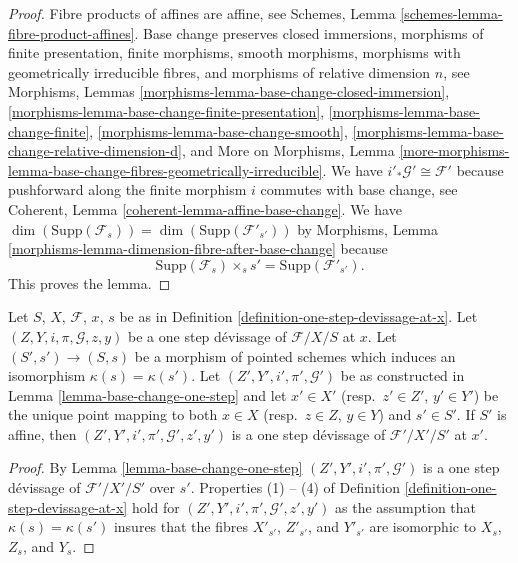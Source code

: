 \begin{proof}
Fibre products of affines are affine, see
Schemes, Lemma \ref{schemes-lemma-fibre-product-affines}.
Base change preserves
closed immersions,
morphisms of finite presentation,
finite morphisms,
smooth morphisms,
morphisms with geometrically irreducible fibres, and
morphisms of relative dimension $n$, see
Morphisms, Lemmas \ref{morphisms-lemma-base-change-closed-immersion},
\ref{morphisms-lemma-base-change-finite-presentation},
\ref{morphisms-lemma-base-change-finite},
\ref{morphisms-lemma-base-change-smooth}, 
\ref{morphisms-lemma-base-change-relative-dimension-d}, and
More on Morphisms, Lemma
\ref{more-morphisms-lemma-base-change-fibres-geometrically-irreducible}.
We have $i'_*\mathcal{G}' \cong \mathcal{F}'$ because pushforward
along the finite morphism $i$ commutes with base change, see
Coherent, Lemma \ref{coherent-lemma-affine-base-change}.
We have
$\dim(\text{Supp}(\mathcal{F}_s)) = \dim(\text{Supp}(\mathcal{F}'_{s'}))$
by
Morphisms, Lemma \ref{morphisms-lemma-dimension-fibre-after-base-change}
because
$$
\text{Supp}(\mathcal{F}_s) \times_s s' = \text{Supp}(\mathcal{F}'_{s'}).
$$
This proves the lemma.
\end{proof}

\begin{lemma}
\label{lemma-base-change-one-step-at-x}
Let $S$, $X$, $\mathcal{F}$, $x$, $s$ be as in
Definition \ref{definition-one-step-devissage-at-x}.
Let $(Z, Y, i, \pi, \mathcal{G}, z, y)$ be a one step d\'evissage
of $\mathcal{F}/X/S$ at $x$.
Let $(S', s') \to (S, s)$ be a morphism of pointed schemes
which induces an isomorphism $\kappa(s) = \kappa(s')$.
Let $(Z', Y', i', \pi', \mathcal{G}')$ be as constructed in
Lemma \ref{lemma-base-change-one-step}
and let $x' \in X'$ (resp.\ $z' \in Z'$, $y' \in Y'$) be the
unique point mapping to both $x \in X$ (resp.\ $z \in Z$, $y \in Y$)
and $s' \in S'$.
If $S'$ is affine, then $(Z', Y', i', \pi', \mathcal{G}', z', y')$
is a one step d\'evissage of $\mathcal{F}'/X'/S'$ at $x'$.
\end{lemma}

\begin{proof}
By
Lemma \ref{lemma-base-change-one-step}
$(Z', Y', i', \pi', \mathcal{G}')$ is a one step d\'evissage of
$\mathcal{F}'/X'/S'$ over $s'$. Properties (1) -- (4) of
Definition \ref{definition-one-step-devissage-at-x}
hold for $(Z', Y', i', \pi', \mathcal{G}', z', y')$
as the assumption that $\kappa(s) = \kappa(s')$ insures that the fibres
$X'_{s'}$, $Z'_{s'}$, and $Y'_{s'}$ are isomorphic to
$X_s$, $Z_s$, and $Y_s$.
\end{proof}

